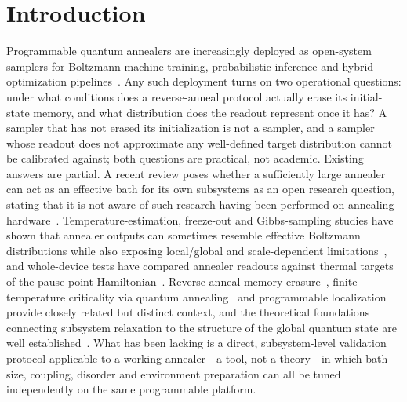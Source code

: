\documentclass[aps,prapplied,reprint,superscriptaddress,floatfix,nofootinbib]{revtex4-2}
\begin{document}
\section{Introduction}

Programmable quantum annealers are increasingly deployed as open-system samplers for Boltzmann-machine training, probabilistic inference and hybrid optimization pipelines~\cite{adachi2015qbm,amin2018qbm,benedetti2017qbm,nelson2022gibbs,vuffray2022boltzmann}.
Any such deployment turns on two operational questions: under what conditions does a reverse-anneal protocol actually erase its initial-state memory, and what distribution does the readout represent once it has?
A sampler that has not erased its initialization is not a sampler, and a sampler whose readout does not approximate any well-defined target distribution cannot be calibrated against; both questions are practical, not academic.
Existing answers are partial. A recent review poses whether a sufficiently large annealer can act as an effective bath for its own subsystems as an open research question, stating that it is not aware of such research having been performed on annealing hardware~\cite{kendon2026qacm}.
Temperature-estimation, freeze-out and Gibbs-sampling studies have shown that annealer outputs can sometimes resemble effective Boltzmann distributions while also exposing local/global and scale-dependent limitations~\cite{raymond2016global,marshall2017freezeout,marshall2019pausing,grattan2025thermometry}, and whole-device tests have compared annealer readouts against thermal targets of the pause-point Hamiltonian~\cite{izquierdo2021thermal}.
Reverse-anneal memory erasure~\cite{pelofske2025erasing}, finite-temperature criticality via quantum annealing~\cite{teza2025finite} and programmable localization~\cite{dacafilho2022localization} provide closely related but distinct context, and the theoretical foundations connecting subsystem relaxation to the structure of the global quantum state are well established~\cite{popescu2006entanglement,goldstein2006canonical,dalessio2016quantum}.
What has been lacking is a direct, subsystem-level validation protocol applicable to a working annealer---a tool, not a theory---in which bath size, coupling, disorder and environment preparation can all be tuned independently on the same programmable platform.
\end{document}
